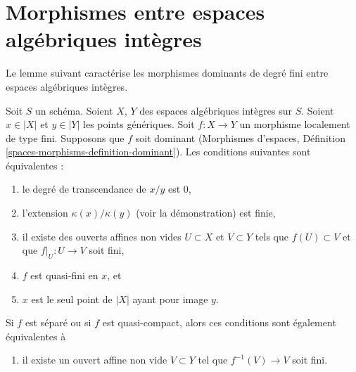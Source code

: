 \section{Morphismes entre espaces algébriques intègres}
\label{section-morphisms-between-integral-spaces}

\noindent
Le lemme suivant caractérise les morphismes dominants de degré fini
entre espaces algébriques intègres.

\begin{lemma}
\label{lemma-finite-degree}
Soit $S$ un schéma. Soient $X$, $Y$ des espaces algébriques intègres sur $S$.
Soient $x \in |X|$ et $y \in |Y|$ les points génériques. Soit $f : X \to Y$
un morphisme localement de type fini. Supposons que $f$ soit dominant
(Morphismes d'espaces, Définition \ref{spaces-morphisms-definition-dominant}).
Les conditions suivantes sont équivalentes :
\begin{enumerate}
\item le degré de transcendance de $x/y$ est $0$,
\item l'extension $\kappa(x)/\kappa(y)$ (voir la démonstration) est finie,
\item il existe des ouverts affines non vides $U \subset X$ et $V \subset Y$
tels que $f(U) \subset V$ et que $f|_U : U \to V$ soit fini,
\item $f$ est quasi-fini en $x$, et
\item $x$ est le seul point de $|X|$ ayant pour image $y$.
\end{enumerate}
Si $f$ est séparé ou si $f$ est quasi-compact, alors ces conditions sont
également équivalentes à
\begin{enumerate}
\item[(6)] il existe un ouvert affine non vide $V \subset Y$ tel
que $f^{-1}(V) \to V$ soit fini.
\end{enumerate}
\end{lemma}

